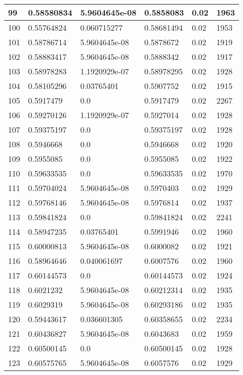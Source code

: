 \begin{longtable}{|l|l|l|l|l|l|}
99 & 0.58580834 & 5.9604645e-08 & 0.5858083 & 0.02 & 1963 \\ \hline 
100 & 0.55764824 & 0.060715277 & 0.58681494 & 0.02 & 1953 \\ \hline 
101 & 0.58786714 & 5.9604645e-08 & 0.5878672 & 0.02 & 1919 \\ \hline 
102 & 0.58883417 & 5.9604645e-08 & 0.5888342 & 0.02 & 1917 \\ \hline 
103 & 0.58978283 & 1.1920929e-07 & 0.58978295 & 0.02 & 1928 \\ \hline 
104 & 0.58105296 & 0.03765401 & 0.5907752 & 0.02 & 1915 \\ \hline 
105 & 0.5917479 & 0.0 & 0.5917479 & 0.02 & 2267 \\ \hline 
106 & 0.59270126 & 1.1920929e-07 & 0.5927014 & 0.02 & 1928 \\ \hline 
107 & 0.59375197 & 0.0 & 0.59375197 & 0.02 & 1928 \\ \hline 
108 & 0.5946668 & 0.0 & 0.5946668 & 0.02 & 1920 \\ \hline 
109 & 0.5955085 & 0.0 & 0.5955085 & 0.02 & 1922 \\ \hline 
110 & 0.59633535 & 0.0 & 0.59633535 & 0.02 & 1970 \\ \hline 
111 & 0.59704024 & 5.9604645e-08 & 0.5970403 & 0.02 & 1929 \\ \hline 
112 & 0.59768146 & 5.9604645e-08 & 0.5976814 & 0.02 & 1937 \\ \hline 
113 & 0.59841824 & 0.0 & 0.59841824 & 0.02 & 2241 \\ \hline 
114 & 0.58947235 & 0.03765401 & 0.5991946 & 0.02 & 1960 \\ \hline 
115 & 0.60000813 & 5.9604645e-08 & 0.6000082 & 0.02 & 1921 \\ \hline 
116 & 0.58964646 & 0.040061697 & 0.6007576 & 0.02 & 1960 \\ \hline 
117 & 0.60144573 & 0.0 & 0.60144573 & 0.02 & 1924 \\ \hline 
118 & 0.6021232 & 5.9604645e-08 & 0.60212314 & 0.02 & 1935 \\ \hline 
119 & 0.6029319 & 5.9604645e-08 & 0.60293186 & 0.02 & 1935 \\ \hline 
120 & 0.59443617 & 0.036601305 & 0.60358655 & 0.02 & 2234 \\ \hline 
121 & 0.60436827 & 5.9604645e-08 & 0.6043683 & 0.02 & 1959 \\ \hline 
122 & 0.60500145 & 0.0 & 0.60500145 & 0.02 & 1928 \\ \hline 
123 & 0.60575765 & 5.9604645e-08 & 0.6057576 & 0.02 & 1929 \\ \hline 

\end{longtable}
